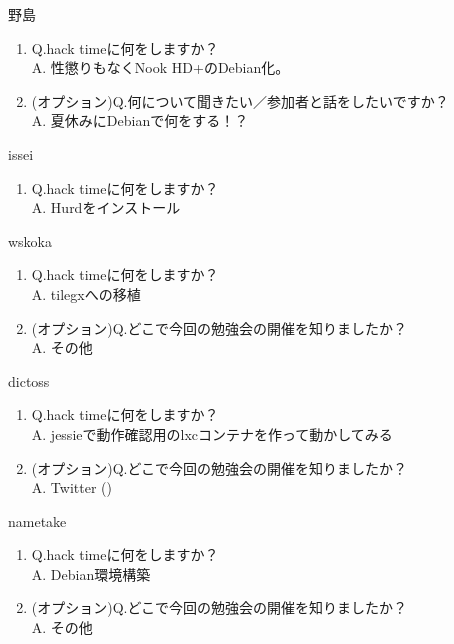 \begin{prework}{ 野島 }
  \begin{enumerate}
  \item Q.hack timeに何をしますか？\\
    A. 性懲りもなくNook HD+のDebian化。
  \item (オプション)Q.何について聞きたい／参加者と話をしたいですか？\\
    A. 夏休みにDebianで何をする！？
  \end{enumerate}
\end{prework}

\begin{prework}{ issei }
  \begin{enumerate}
  \item Q.hack timeに何をしますか？\\
    A. Hurdをインストール
  \end{enumerate}
\end{prework}

\begin{prework}{ wskoka }
  \begin{enumerate}
  \item Q.hack timeに何をしますか？\\
    A. tilegxへの移植
  \item (オプション)Q.どこで今回の勉強会の開催を知りましたか？\\
    A. その他
  \end{enumerate}
\end{prework}

\begin{prework}{ dictoss }
  \begin{enumerate}
  \item Q.hack timeに何をしますか？\\
    A. jessieで動作確認用のlxcコンテナを作って動かしてみる
  \item (オプション)Q.どこで今回の勉強会の開催を知りましたか？\\
    A. Twitter (\@debianjp)
  \end{enumerate}
\end{prework}

\begin{prework}{ nametake }
  \begin{enumerate}
  \item Q.hack timeに何をしますか？\\
    A. Debian環境構築
  \item (オプション)Q.どこで今回の勉強会の開催を知りましたか？\\
    A. その他
  \end{enumerate}
\end{prework}


